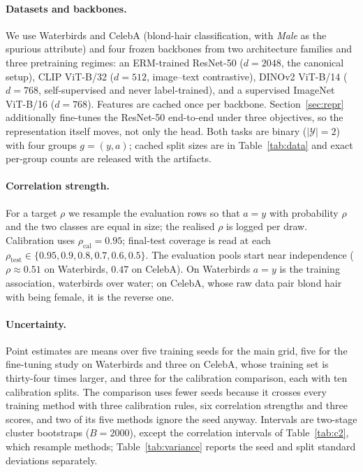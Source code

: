 \documentclass[pdflatex,sn-basic]{sn-jnl}%
\theoremstyle{thmstyleone}%
\newcommand{\rhocal}{\rho_{\mathrm{cal}}}
\newcommand{\rhotest}{\rho_{\mathrm{test}}}
\begin{document}
\paragraph{Datasets and backbones.} We use Waterbirds and CelebA (blond-hair
classification, with \emph{Male} as the spurious attribute) and four frozen backbones from two
architecture families and three pretraining regimes: an ERM-trained
ResNet-50 ($d{=}2048$, the canonical setup), CLIP ViT-B/32 ($d{=}512$, image--text
contrastive), DINOv2 ViT-B/14 ($d{=}768$, self-supervised and never label-trained), and
a supervised ImageNet ViT-B/16 ($d{=}768$). Features are cached once per backbone.
Section~\ref{sec:repr} additionally fine-tunes the ResNet-50 end-to-end under three
objectives, so the representation itself moves, not only the head. Both tasks are binary
($|\mathcal{Y}|=2$) with four groups $g=(y,a)$; cached split sizes are in
Table~\ref{tab:data} and exact per-group counts are released with the artifacts.

\paragraph{Correlation strength.} For a target $\rho$ we resample the evaluation rows
so that $a=y$ with probability $\rho$ and the two classes are equal in size; the realised $\rho$ is
logged per draw. Calibration uses $\rhocal=0.95$; final-test coverage is read at each
$\rhotest\in\{0.95,0.9,0.8,0.7,0.6,0.5\}$. The evaluation pools start near independence
($\rho\approx0.51$ on Waterbirds, $0.47$ on CelebA). On Waterbirds $a=y$ is the training
association, waterbirds over water; on CelebA, whose raw data pair blond hair with being female,
it is the reverse one.

\paragraph{Uncertainty.} Point estimates are means over five training seeds for the
main grid, five for the fine-tuning study on Waterbirds and three on CelebA, whose training set
is thirty-four times larger, and three for the
calibration comparison, each with ten calibration splits. The comparison uses fewer seeds because it crosses every
training method with three calibration rules, six correlation strengths and three
scores, and two of its five methods ignore the seed anyway. Intervals are two-stage cluster
bootstraps ($B=2000$), except the correlation intervals of Table~\ref{tab:c2}, which resample
methods; Table~\ref{tab:variance} reports the seed and split standard deviations separately.
\end{document}
